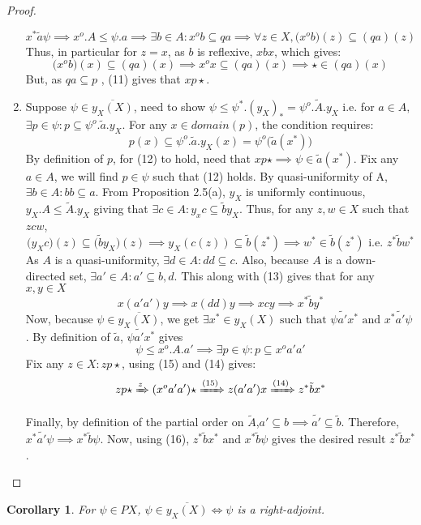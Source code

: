 \documentclass[18pt,a4paper]{article}
\newtheorem{coro}{Corollary}[section]
\theoremstyle{definition}
\begin{document}
\begin{proof}
\begin{enumerate}[label=(\alph*)]
		\begin{equation} x^* \tilde{a} \psi \implies x^o.A \leq \psi.a
		\implies \exists b\in A: x^ob \subseteq qa
		\implies \forall z \in X, \big(x^o b \big)(z) \subseteq (qa)(z)
	\end{equation}
	Thus, in particular for $z=x$, as $b$ is reflexive, $xbx$, which gives:
	\begin{equation} \big(x^o b \big)(x) \subseteq (qa)(x) \implies x^ox \subseteq (qa)(x) \implies \star \in (qa)(x) \end{equation}
	But, as $qa \subseteq p$ , (11) gives that $xp\star$.
\item Suppose $\psi \in \overline{y_X(X)}$, need to show $\psi \leq \psi^*.(y_X)_*=\psi^o.\tilde{A}.y_X$ i.e.
	for $a \in A,$ $\exists p \in \psi: p \subseteq \psi^o.\tilde{a}.y_X$. For any $x \in domain(p)$,
	the condition requires:
	\begin{equation}
		p(x) \subseteq  \psi^o.\tilde{a} .y_X(x)=\psi^o\big(\tilde{a} (x^*)\big)
	\end{equation}
	By definition of $p$, for (12) to hold, need that $xp\star \implies \psi \in \tilde{a}(x^*) $. Fix
	any $a\in A$, we will find $p \in \psi$ such that (12) holds. By quasi-uniformity of A,
	$\exists b \in A: bb \subseteq a$. From Proposition 2.5(a), $y_X$ is uniformly continuous,
	$y_X.A \leq \tilde{A}.y_X $ giving that $\exists c \in A: y_xc \subseteq \tilde{b}y_X $. Thus, for
	any $z,w\in X$ such that $z c w$,
	\begin{equation} \big(y_X c \big)(z) \subseteq \big(\tilde{b} y_X\big)(z) \implies
	y_X(c(z)) \subseteq \tilde{b}(z^*) \implies w^* \in \tilde{b}(z^*) \text{ i.e. } z^* \tilde{b} w^*
	\end{equation}
	As $A$ is a quasi-uniformity, $\exists d\in A: dd \subseteq c$. Also, because $A$ is a down-
	directed set, $\exists a' \in A: a' \subseteq b,d $. This along with (13) gives that
	for any $x,y \in X$
	\begin{equation} x(a'a')y \implies x(dd)y \implies xcy \implies x^* \tilde{b} y^* \end{equation}
	Now, because $\psi \in \overline{y_X(X)}$, we get
	$\exists x^* \in y_X(X) \text{ such that } \psi \tilde{a'}x^* \text{ and } x^* \tilde{a'} \psi $.
	By definition of $\tilde{a}$, $\psi \tilde{a'}x^*$ gives
	\begin{equation} \psi \leq x^o.A.a' \implies \exists p \in \psi: p \subseteq x^o a'a' \end{equation}
	Fix any $z \in X : zp \star$, using (15) and (14) gives:
	\begin{equation} zp \star \xRightarrow z(x^o a'a') \star \xRightarrow{(15)} z(a'a')x
	 \xRightarrow{(14)} z^* \tilde{b}x^*   \end{equation}

	 Finally, by definition of the partial order on $\tilde{A}$,$a' \subseteq b \implies \tilde{a'}
	 \subseteq \tilde{b} $. Therefore,  $x^* \tilde{a'}\psi \implies x^* \tilde{b}\psi$.
	 Now, using (16), $z^* \tilde{b}x^* \text{ and } x^*\tilde{b}\psi  $ gives the desired result
	 $z^* \tilde{b} x^* $.
\end{enumerate}
\end{proof}


\begin{coro}
	For $\psi \in PX$, $\psi \in \overline{y_X(X)} \iff \psi$ is a right-adjoint.
\end{coro}
\end{document}

